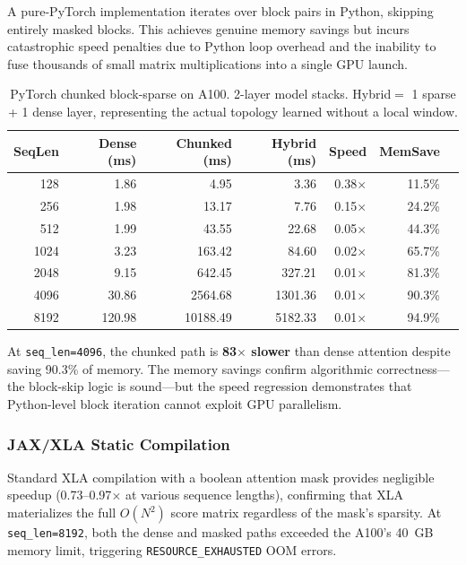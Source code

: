 \documentclass[11pt,a4paper]{article}
\begin{document}
A pure-PyTorch implementation iterates over block pairs in Python, skipping entirely masked blocks. This achieves genuine memory savings but incurs catastrophic speed penalties due to Python loop overhead and the inability to fuse thousands of small matrix multiplications into a single GPU launch.

\begin{table}[h]
\centering
\caption{PyTorch chunked block-sparse on A100. 2-layer model stacks. Hybrid$=$ 1 sparse + 1 dense layer, representing the actual topology learned without a local window.}
\label{tab:chunked}
\begin{tabular}{@{}rrrrrrr@{}}
\toprule
SeqLen & Dense (ms) & Chunked (ms) & Hybrid (ms) & Speed & MemSave \\
\midrule
128   & 1.86    & 4.95      & 3.36    & 0.38$\times$ & 11.5\% \\
256   & 1.98    & 13.17     & 7.76    & 0.15$\times$ & 24.2\% \\
512   & 1.99    & 43.55     & 22.68   & 0.05$\times$ & 44.3\% \\
1024  & 3.23    & 163.42    & 84.60   & 0.02$\times$ & 65.7\% \\
2048  & 9.15    & 642.45    & 327.21  & 0.01$\times$ & 81.3\% \\
4096  & 30.86   & 2564.68   & 1301.36 & 0.01$\times$ & 90.3\% \\
8192  & 120.98  & 10188.49  & 5182.33 & 0.01$\times$ & 94.9\% \\
\bottomrule
\end{tabular}
\end{table}

At \texttt{seq\_len=4096}, the chunked path is \textbf{83$\times$ slower} than dense attention despite saving 90.3\% of memory. The memory savings confirm algorithmic correctness---the block-skip logic is sound---but the speed regression demonstrates that Python-level block iteration cannot exploit GPU parallelism.

\subsubsection{JAX/XLA Static Compilation}

Standard XLA compilation with a boolean attention mask provides negligible speedup (0.73--0.97$\times$ at various sequence lengths), confirming that XLA materializes the full $O(N^2)$ score matrix regardless of the mask's sparsity. At \texttt{seq\_len=8192}, both the dense and masked paths exceeded the A100's 40~GB memory limit, triggering \texttt{RESOURCE\_EXHAUSTED} OOM errors.
\end{document}
